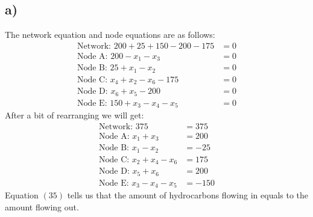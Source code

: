 \documentclass[12pt]{article}
\begin{document}
\subsection{a)}
The network equation and node equations are as follows:
\begin{align*}
\text{Network: }200+25+150-200-175&=0 \\
\text{Node A: }200-x_1-x_3&=0 \\
\text{Node B: }25+x_1-x_2&=0 \\
\text{Node C: }x_4+x_2-x_6-175&=0 \\
\text{Node D: }x_6+x_5-200&=0 \\
\text{Node E: }150+x_3-x_4-x_5&=0
\end{align*}
After a bit of rearranging we will get:
\begin{align}
\text{Network: }375&=375 \\
\text{Node A: }x_1+x_3&=200 \\
\text{Node B: }x_1-x_2&=-25 \\
\text{Node C: }x_2+x_4-x_6&=175 \\
\text{Node D: }x_5+x_6&=200 \\
\text{Node E: }x_3-x_4-x_5&=-150
\end{align}
Equation $(35)$ tells us that the amount of hydrocarbons flowing in equals to the amount flowing out.
\end{document}
